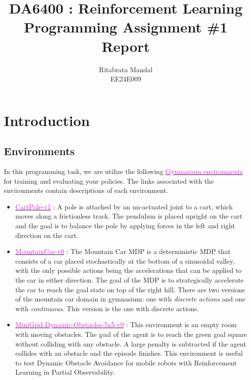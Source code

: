 \documentclass[11pt, a4]{article}
\begin{document}
	\author{Ritabrata Mandal\\ EE24E009}
	\title{DA6400 : Reinforcement Learning\\ Programming Assignment \#1\\ Report}
	\maketitle
	\medskip
	\newpage
	\tableofcontents
	\newpage
	\section{Introduction}
		\subsection{Environments}
		In this programming task, we are utilize the following \href{https://gymnasium.farama.org/}{\textcolor{magenta}{Gymnasium environments}} for training
		and evaluating your policies. The links associated with the environments contain descriptions
		of each environment.
		\begin{itemize}
			\item \href{https://gymnasium.farama.org/environments/classic_control/cart_pole/}{\textcolor{magenta}{CartPole-v1}} : A pole is attached by an un-actuated joint to a cart, which moves along	a frictionless track. The pendulum is placed upright on the cart and the goal is to
			balance the pole by applying forces in the left and right direction on the cart.
			\item \href{https://gymnasium.farama.org/environments/classic_control/mountain_car/}{\textcolor{magenta}{MountainCar-v0}} : The Mountain Car MDP is a deterministic MDP that consists of a
			car placed stochastically at the bottom of a sinusoidal valley, with the only possible
			actions being the accelerations that can be applied to the car in either direction. The
			goal of the MDP is to strategically accelerate the car to reach the goal state on top of
			the right hill. There are two versions of the mountain car domain in gymnasium: one
			with \textit{discrete actions} and one with \textit{continuous}. This version is the one with discrete
			actions.
			\item \href{https://minigrid.farama.org/environments/minigrid/DynamicObstaclesEnv/}{\textcolor{magenta}{MiniGrid-Dynamic-Obstacles-5x5-v0}} : This environment is an empty
			room with moving obstacles. The goal of the agent is to reach the green goal square
			without colliding with any obstacle. A large penalty is subtracted if the agent collides
			with an obstacle and the episode finishes. This environment is useful to test Dynamic
			Obstacle Avoidance for mobile robots with Reinforcement Learning in Partial Observability.
		\end{itemize}
\end{document}
